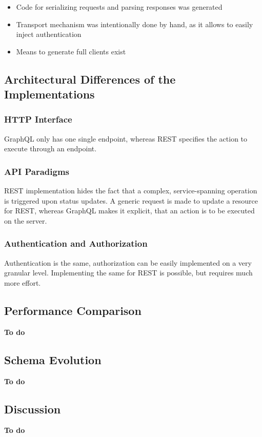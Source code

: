 \begin{itemize}
    \item Code for serializing requests and parsing responses was generated
    \item Transport mechanism was intentionally done by hand, as it allows to easily inject authentication
    \item Means to generate full clients exist
\end{itemize}

\subsection{Architectural Differences of the Implementations}

\subsubsection{\acs{HTTP} Interface}

GraphQL only has one single endpoint, whereas REST specifies the action to execute through an endpoint.

\subsubsection{\acs{API} Paradigms}

REST implementation hides the fact that a complex, service-spanning operation is triggered upon status updates.
A generic request is made to update a resource for REST, whereas GraphQL makes it explicit, that an action is to be executed on the server.

\subsubsection{Authentication and Authorization}

Authentication is the same, authorization can be easily implemented on a very granular level.
Implementing the same for REST is possible, but requires much more effort.

\subsection{Performance Comparison}

\textbf{To do}

\subsection{Schema Evolution}

\textbf{To do}

\subsection{Discussion}

\textbf{To do}
